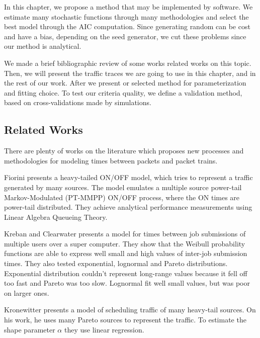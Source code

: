 In this chapter, we propose a method that may be implemented by  software. We estimate many stochastic functions through many methodologies and select the best model through the AIC computation\cite{bic-aic-comparision}. Since generating random can be cost and have a bias, depending on the seed generator, we cut these problems since our method is analytical. 

We made a brief bibliographic review of some works related works on this topic. Then, we will present the traffic traces we are going to use in this chapter, and in the rest of our work. After we present or selected method for parameterization and fitting choice. To test our criteria quality, we define a validation method, based on cross-validations made by simulations.

\subsection{Related Works}

There are plenty of works on the literature which proposes new processes and methodologies for modeling times between packets and packet trains.

Fiorini \cite{modeling-concurrent-heavy-tailed} presents a heavy-tailed ON/OFF model, which tries to represent a traffic generated by many sources. The model emulates a multiple source power-tail Markov-Modulated (PT-MMPP) ON/OFF process, where the ON times are power-tail distributed. They achieve analytical performance measurements using Linear Algebra Queueing Theory.

Kreban and Clearwater\cite{hierarchical-dynamics-interarrival-times} presents a model for times between job submissions of multiple users over a super computer. They show that the Weibull probability functions are able to express well small and high values of inter-job submission times. They also tested exponential, lognormal and Pareto distributions. Exponential distribution couldn't  represent long-range values because it fell off too fast and Pareto was too slow. Lognormal fit well small values, but was poor on larger ones.    

Kronewitter\cite{optimal-scheduling-of-heavy-tailed-traffic} presents a model of scheduling traffic of many heavy-tail sources. On his work, he uses many Pareto sources to represent the traffic. To estimate the shape parameter $\alpha$ they use linear regression.

